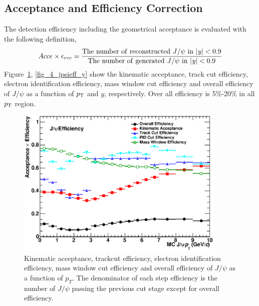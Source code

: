 \subsection{Acceptance and Efficiency Correction}
\label{sec_4_correction}
The detection efficiency including the geometrical acceptance is evaluated with the following definition, 
\begin{equation}
  Acce\times \epsilon_{rec} = \frac{\rm{The~ number~ of~ reconstructed}~ \it{J/\psi} ~\rm{in}~ |\it{y}| < \rm{0.9}}{\rm{The~number~of~generated}~\it{J/\psi} ~\rm{in}~ |\it{y}| < \rm{0.9}}
\end{equation}
Figure~\ref{fig_4_jpsieff_pt}, \ref{fig_4_jpsieff_y} show the kinematic acceptance, track cut efficiency, electron identification efficiency, mass window cut efficiency and overall efficiency of $J/\psi$ as a function of $p_{\rm{T}}$ and $y$, respectively.
Over all efficiency is 5\%-20\% in all $p_{\rm{T}}$ region. 
\begin{figure}[!h]
  \centering
  \includegraphics[width=10cm]{chap4/figure/Correction/JpsiEff_pt_stepbystep_bin2.eps}	
  \caption{Kinematic acceptance, trackcut efficiency, electron identification efficiency, mass window cut efficiency and overall efficiency of $J/\psi$ as a function of $p_{T}$. The denominator of each step efficiency is the number of $J/\psi$ passing the previous cut stage except for overall efficiency. }
  \label{fig_4_jpsieff_pt}
\end{figure}
